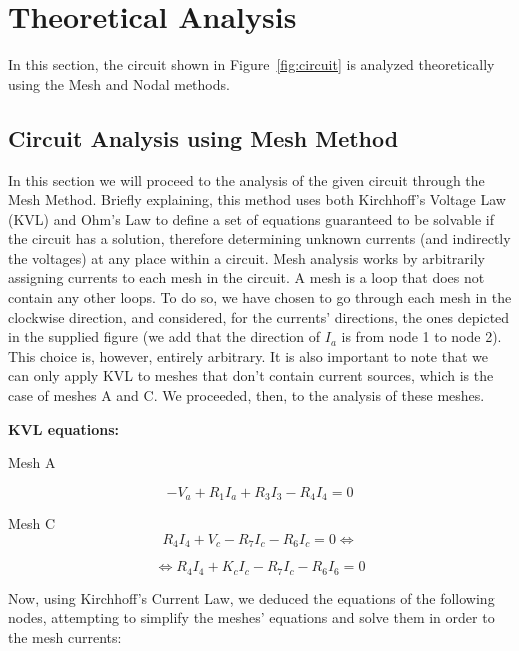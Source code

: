 \newpage
\section{Theoretical Analysis}
\label{sec:analysis}

In this section, the circuit shown in Figure~\ref{fig:circuit} is analyzed
theoretically using the Mesh and Nodal methods. 

\subsection{Circuit Analysis using Mesh Method}
\label{sec:mesh}
In this section we will proceed to the analysis of the given circuit through the Mesh Method.
Briefly explaining, this method uses both Kirchhoff’s Voltage Law (KVL) and Ohm’s Law to define a set of equations guaranteed to be solvable if the circuit has a solution, therefore determining unknown currents (and indirectly the voltages) at any place within a circuit.
Mesh analysis works by arbitrarily assigning currents to each mesh in the circuit. A mesh is a loop that does not contain any other loops.
To do so, we have chosen to go through each mesh in the clockwise direction, and considered, for the currents' directions, the ones depicted in the supplied figure (we add that the direction of $I_a$ is from node 1 to node 2). This choice is, however, entirely arbitrary. It is also important to note that we can only apply KVL to meshes that don't contain current sources, which is the case of meshes A and C. We proceeded, then, to the analysis of these meshes.
\par
\medskip

\textbf{KVL equations:}

Mesh A

\begin{equation}
	-V_a + R_1I_a + R_3I_3 - R_4I_4 = 0
	\label{eq:kvl}
\end{equation}


Mesh C
\begin{equation}
	R_4I_4 + V_c - R_7I_c - R_6I_c = 0\Leftrightarrow
	\label{eq:kvl1}
\end{equation}

\begin{equation}
	\Leftrightarrow R_4I_4 + K_cI_c - R_7I_c - R_6I_6 = 0
	\label{eq:kvl1}
\end{equation}

Now, using Kirchhoff's Current Law, we deduced the equations of the following nodes, attempting to simplify the meshes' equations and solve them in order to the mesh currents:
\par
\medskip

